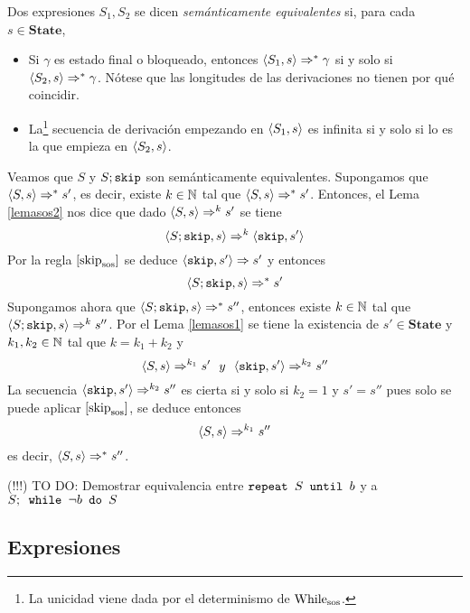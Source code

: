 \begin{definition}
Dos expresiones $S_1, S_2$ se dicen \textit{semánticamente equivalentes} si, para cada $s \in \mathbf{State}$, 
\begin{itemize}
    \item Si $\gamma$ es estado final o bloqueado, entonces $\langle S_1, s \rangle\Rightarrow^* \gamma$ si y solo si $\langle S_2, s \rangle \Rightarrow^*\gamma$. Nótese que las longitudes de las derivaciones no tienen por qué coincidir.
    \item La\footnote{La unicidad viene dada por el determinismo de $\mathrm{While}_{\mathrm{sos}}$.} secuencia de derivación empezando en $\langle S_1, s \rangle$ es infinita si y solo si lo es la que empieza en $\langle S_2, s \rangle$.
\end{itemize} 
\end{definition}

\begin{example}
Veamos que $S$ y $S; \texttt{skip}$ son semánticamente equivalentes. Supongamos que $\langle S, s \rangle\Rightarrow^*s'$, es decir, existe $k\in\mathbb{N}$ tal que $\langle S, s \rangle\Rightarrow^*s'$. Entonces, el Lema \ref{lemasos2} nos dice que dado $\langle S, s \rangle\Rightarrow^k s'$ se tiene
\[
    \langle S; \texttt{skip}, s \rangle\Rightarrow^k \langle  \texttt{skip}, s' \rangle
\]
Por la regla $[\mathrm{skip}_{\mathrm{sos}}]$ se deduce $\langle  \texttt{skip}, s' \rangle \Rightarrow s'$ y entonces
\[
    \langle S;  \texttt{skip}, s \rangle \Rightarrow^* s'
\]
Supongamos ahora que $\langle S; \texttt{skip}, s \rangle\Rightarrow^*s''$, entonces existe $k\in\mathbb{N}$ tal que  $\langle S; \texttt{skip}, s \rangle\Rightarrow^k s''$. Por el Lema \ref{lemasos1} se tiene la existencia de $s'\in\textbf{State}$ y $k_1,k_2\in\mathbb{N}$ tal que $k = k_1 + k_2$ y
\[
    \la{S}{s}\dto^{k_1} s'\ \ y\ \ \la{\n{skip}}{s'}\dto^{k_2} s''
\]
La secuencia $\langle \texttt{skip}, s' \rangle\Rightarrow^{k_2} s''$ es cierta si y solo si $k_2 = 1$ y $s' = s''$ pues solo se puede aplicar $[\mathrm{skip}_{\mathrm{sos}}]$, se deduce entonces
\[
    \langle S, s \rangle\Rightarrow^{k_1} s''
\]
es decir, $\langle S, s \rangle\Rightarrow^{*} s''$.
\end{example}

\begin{example} (!!!) TO DO: Demostrar equivalencia entre  $\texttt{repeat }S\texttt{ until }b$ y a $S;\texttt{ while }\neg b\texttt{ do } S$
\end{example}
\subsection{Expresiones}


